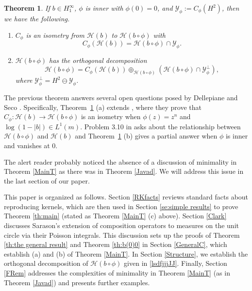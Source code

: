 \documentclass[11pt]{amsart}
\def\HH{{\mathcal H}}
\def\YY{{\mathcal Y}}
\numberwithin{equation}{section}
\theoremstyle{plain}
\newtheorem{theorem}[equation]{Theorem}
\theoremstyle{definition}
\begin{document}
\begin{theorem}\label{onepointsix}
If $b \in H^{\infty}_{1}$, $\phi$ is inner with  $\phi(0) = 0$, and $\mathcal{Y}_{\phi} := C_{\phi}(H^2)$, then we have the following.
\begin{enumerate}
    \item $C_{\phi}$  is an isometry from $\mathcal{H}(b)$ to $\mathcal{H}(b \circ \phi)$ with  $$C_\phi(\HH(b))=\HH(b\circ\phi)\cap\YY_\phi.$$ 
    \item $\HH(b\circ\phi)$ has the orthogonal decomposition 	
    \begin{equation}\label{lsdfjjjJJ}
        \HH(b\circ\phi)= C_\phi(\HH(b))\oplus_{	\HH(b\circ\phi)} 	\left(\HH(b\circ\phi)\cap\YY_\phi^\perp\right),
    \end{equation}
	where $\mathcal{Y}_{\phi}^{\perp} = H^2 \ominus \mathcal{Y}_{\phi}$. 
\end{enumerate}
\end{theorem}

	The previous theorem answers several open questions posed by Dellepiane and Seco \cite{DELLEPIANE2027130974}. Specifically, Theorem~\ref{onepointsix} (a) extends \cite[Theorem 3.9]{DELLEPIANE2027130974}, where they prove that  $C_\phi:\HH(b)\to \HH(b\circ\phi)$ is an isometry when $\phi(z)=z^n$ and $\log(1 - |b|) \in L^1(m)$. Problem 3.10 in \cite{DELLEPIANE2027130974} asks about the relationship between $\HH(b\circ\phi)$ and $\HH(b)$ and Theorem~\ref{onepointsix} (b) gives a partial answer when $ \phi $ is inner and vanishes at $0$. %

    
The alert reader probably noticed the absence of a discussion of minimality in Theorem \ref{MainT} as there was in Theorem \ref{Javad}. We will address this issue in the last section of our paper.  

This paper is organized as follows. Section \ref{RKfacts} reviews standard facts about reproducing kernels, which are then used in Section  \ref{se:simple results} to prove  Theorem \ref{th:main} (stated as Theorem \ref{MainT} (c) above). Section  \ref{Clark} discusses Sarason's extension of composition operators to measures on the unit circle via their Poisson integrals. This discussion sets  up the proofs of Theorem \ref{th:the general result} and Theorem \ref{th:b(0)0} in Section \ref{GeneralC}, which establish 
(a) and (b) of Theorem \ref{MainT}. In Section \ref{Structure},
we establish the orthogonal decomposition of $\HH(b  \circ \phi)$ given in \eqref{lsdfjjjJJ}. Finally, Section \ref{FRem} addresses the complexities of minimality in Theorem \ref{MainT} (as in Theorem \ref{Javad}) and presents further examples.   
\end{document}
